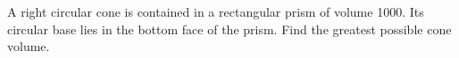 A right circular cone is contained in a rectangular prism of volume 1000. Its circular base lies in the bottom face of the prism. Find the greatest possible cone volume.
